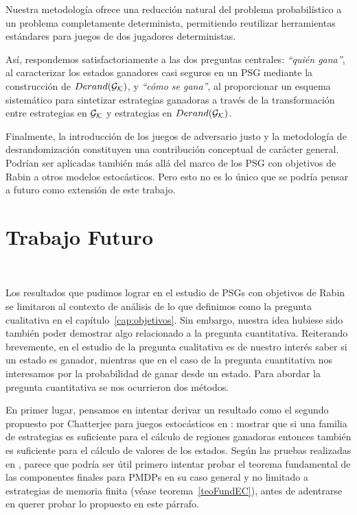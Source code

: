 Nuestra metodología ofrece una reducción natural del problema probabilístico a
un problema completamente determinista, permitiendo reutilizar herramientas
estándares para juegos de dos jugadores deterministas.

Así, respondemos satisfactoriamente a las dos preguntas centrales:
\textit{“quién gana”}, al caracterizar los estados ganadores casi seguros en un
PSG mediante la construcción de $Derand(\mathcal{G}_{\mathcal{K}})$, y \textit{“cómo se gana”}, al
proporcionar un esquema sistemático para sintetizar estrategias ganadoras a
través de la transformación entre estrategias en $\mathcal{G}_{\mathcal{K}}$ y estrategias en $Derand(\mathcal{G}_{\mathcal{K}})$.

Finalmente, la introducción de los juegos de adversario justo y la metodología
de desrandomización constituyen una contribución conceptual de carácter
general. Podrían ser aplicadas también más allá del marco de los PSG con
objetivos de Rabin a otros modelos estocásticos. Pero esto no es lo único que
se podría pensar a futuro como extensión de este trabajo.


\section{Trabajo Futuro}
~\label{cap:conclusions:sec:future}

Los resultados que pudimos lograr en el estudio de PSGs con objetivos de Rabin
se limitaron al contexto de análisis de lo que definimos como la pregunta
cualitativa en el capítulo~\ref{cap:objetivos}. Sin embargo, nuestra idea
hubiese sido también poder demostrar algo relacionado a la pregunta
cuantitativa. Reiterando brevemente, en el estudio de la pregunta cualitativa
es de nuestro interés saber si un estado es ganador, mientras que en el caso de
la pregunta cuantitativa nos interesamos por la probabilidad de ganar desde un
estado. Para abordar la pregunta cuantitativa se nos ocurrieron dos métodos.

En primer lugar, pensamos en intentar derivar un resultado como el segundo
propuesto por Chatterjee para juegos estocásticos en \cite{ComplexityRabin}:
mostrar que si una familia de estrategias es suficiente para el cálculo de
regiones ganadoras entonces también es suficiente para el cálculo de valores de
los estados. Según las pruebas realizadas en \cite{ComplexityRabin}, parece que
podría ser útil primero intentar probar el teorema fundamental de las
componentes finales para PMDPs en su caso general y no limitado a estrategias
de memoria finita (véase teorema~\ref{teoFundEC}), antes de adentrarse en
querer probar lo propuesto en este párrafo.

